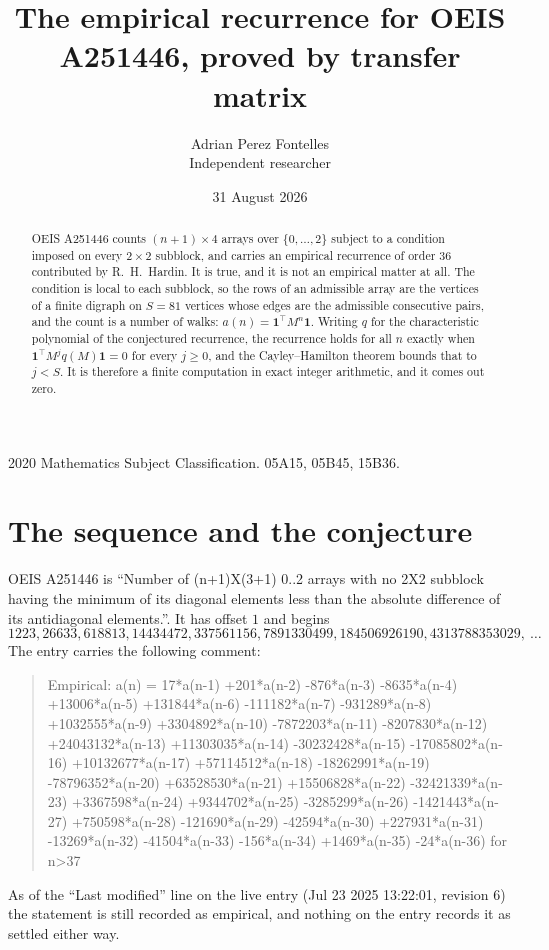 \documentclass[11pt,a4paper]{article}
\title{The empirical recurrence for OEIS A251446, proved by transfer matrix}
\author{Adrian Perez Fontelles\\ \small Independent researcher}
\date{31 August 2026}
\theoremstyle{plain}
\theoremstyle{definition}
\begin{document}
\maketitle

\begin{abstract}
OEIS A251446 counts $(n+1)\times4$ arrays over $\{0,\dots,2\}$ subject to a condition imposed on
every $2\times2$ subblock, and carries an empirical recurrence of order $36$ contributed
by R.~H.~Hardin. It is true, and it is not an empirical matter at all. The condition is local
to each subblock, so the rows of an admissible array are the vertices of a finite digraph
on $S=81$ vertices whose edges are the admissible consecutive pairs, and the count is a
number of walks: $a(n)=\mathbf{1}^{\!\top}M^{n}\mathbf{1}$. Writing $q$
for the characteristic polynomial of the conjectured recurrence, the recurrence holds for all
$n$ exactly when $\mathbf{1}^{\!\top}M^{j}q(M)\mathbf{1}=0$ for every $j\ge0$, and the
Cayley--Hamilton theorem bounds that to $j<S$. It is therefore a finite computation in exact
integer arithmetic, and it comes out zero.
\end{abstract}

\noindent\small 2020 Mathematics Subject Classification. 05A15, 05B45, 15B36.\normalsize

\section{The sequence and the conjecture}

OEIS A251446 is ``Number of (n+1)X(3+1) 0..2 arrays with no 2X2 subblock having the minimum of its diagonal elements less than the absolute difference of its antidiagonal elements.''. It has offset $1$ and begins
\[
1223, 26633, 618813, 14434472, 337561156, 7891330499, 184506926190, 4313788353029,\ \dots
\]
The entry carries the following comment:
\begin{quote}\small
Empirical: a(n) = 17*a(n-1) +201*a(n-2) -876*a(n-3) -8635*a(n-4) +13006*a(n-5) +131844*a(n-6) -111182*a(n-7) -931289*a(n-8) +1032555*a(n-9) +3304892*a(n-10) -7872203*a(n-11) -8207830*a(n-12) +24043132*a(n-13) +11303035*a(n-14) -30232428*a(n-15) -17085802*a(n-16) +10132677*a(n-17) +57114512*a(n-18) -18262991*a(n-19) -78796352*a(n-20) +63528530*a(n-21) +15506828*a(n-22) -32421339*a(n-23) +3367598*a(n-24) +9344702*a(n-25) -3285299*a(n-26) -1421443*a(n-27) +750598*a(n-28) -121690*a(n-29) -42594*a(n-30) +227931*a(n-31) -13269*a(n-32) -41504*a(n-33) -156*a(n-34) +1469*a(n-35) -24*a(n-36) for n>37
\end{quote}
As of the ``Last modified'' line on the live entry (Jul 23 2025 13:22:01, revision 6) the statement is
still recorded as empirical, and nothing on the entry records it as settled either way.
\end{document}
